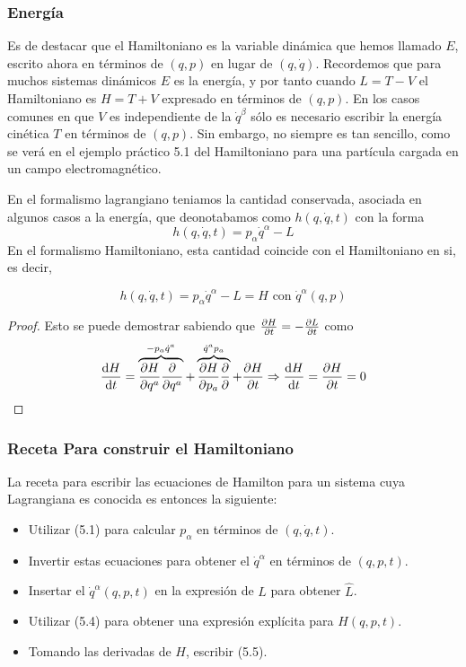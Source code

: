 \subsubsection{Energía}

Es de destacar que el Hamiltoniano es la variable dinámica que hemos llamado $E$, escrito ahora en términos de $(q, p)$ en lugar de $(q, \dot{q})$. Recordemos que para muchos sistemas dinámicos $E$ es la energía, y por tanto cuando $L=T-V$ el Hamiltoniano es $H=T+V$ expresado en términos de $(q, p)$. En los casos comunes en que $V$ es independiente de la $\dot{q}^{\beta}$ sólo es necesario escribir la energía cinética $T$ en términos de $(q, p)$. Sin embargo, no siempre es tan sencillo, como se verá en el ejemplo práctico 5.1 del Hamiltoniano para una partícula cargada en un campo electromagnético.

En el formalismo lagrangiano teniamos la cantidad conservada, asociada en algunos casos a la energía, que deonotabamos como $h(q,\dot{q},t)$ con la forma 
\[h(q,\dot{q},t)=p_{\alpha}\dot{q}^{\alpha}-L\]
En el formalismo Hamiltoniano, esta cantidad coincide con el Hamiltoniano en si, es decir,

\[h(q,\dot{q},t)=p_{\alpha}\dot{q}^{\alpha}-L=H \text{ con }\dot{q}^{\alpha}(q,p)\]

\begin{proof}
  Esto se puede demostrar sabiendo que $\pdv{H}{t}=-\pdv{L}{t}$ como 
  \[\dv{H}{t}=\overbrace{\pdv{H}{q^{a}}\pdv{q^{a}}}^{-p_{a}\dot{q}^{a}} + \overbrace{\pdv{H}{p_{a}}\pdv{}{}}^{\dot{q}^{a}p_{a}}+\pdv{H}{t}\Rightarrow \dv{H}{t}=\pdv{H}{t}=0 \]
\end{proof}



\subsubsection{Receta Para construir el Hamiltoniano}

La receta para escribir las ecuaciones de Hamilton para un sistema cuya Lagrangiana es conocida es entonces la siguiente:
\begin{itemize}
  \item Utilizar (5.1) para calcular $p_{\alpha}$ en términos de $(q, \dot{q}, t)$.
  \item Invertir estas ecuaciones para obtener el $\dot{q}^{\alpha}$ en términos de $(q, p, t)$.
  \item Insertar el $\dot{q}^{{\alpha}}(q, p, t)$ en la expresión de $L$ para obtener $\hat{L}$.
  \item Utilizar (5.4) para obtener una expresión explícita para $H(q, p, t)$.
  \item Tomando las derivadas de $H$, escribir (5.5).
\end{itemize}

